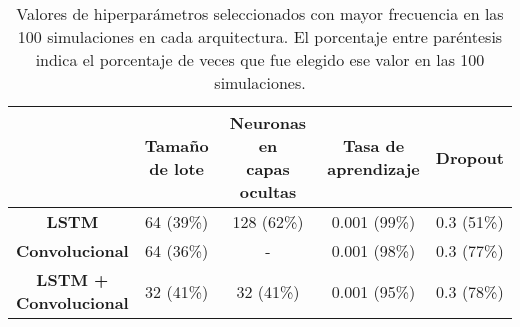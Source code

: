 \documentclass[../../main.tex]{subfiles}
\begin{document}
\begin{table}[H]
    \centering
    \renewcommand{\arraystretch}{1.2}
    \begin{tabular}{|c|c|c|c|c|}
        \hline
            & \makecell{\textbf{Tamaño}\\\textbf{de lote}}
            & \makecell{\textbf{Neuronas en}\\\textbf{capas ocultas}}
            & \makecell{\textbf{Tasa de}\\\textbf{aprendizaje}}
            & \textbf{Dropout} \\ \hline\hline
        \textbf{LSTM}
            & 64 (39\%) & 128 (62\%) & 0.001 (99\%) & 0.3 (51\%) \\ \hline
        \textbf{Convolucional}
            & 64 (36\%) & -          & 0.001 (98\%) & 0.3 (77\%) \\ \hline
        \makecell{\textbf{LSTM +}\\\textbf{Convolucional}}
            & 32 (41\%) & 32 (41\%)  & 0.001 (95\%) & 0.3 (78\%) \\
        \hline
    \end{tabular}
    \caption{Valores de hiperparámetros seleccionados con mayor frecuencia en las 100
    simulaciones en cada arquitectura. El porcentaje entre paréntesis indica el porcentaje
    de veces que fue elegido ese valor en las 100 simulaciones.}
    \label{tab:hyperparams_exp4}
\end{table}
\end{document}
